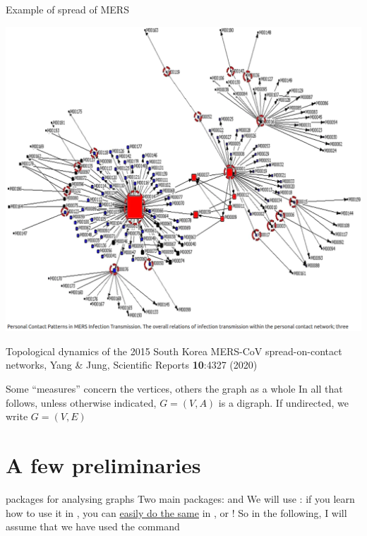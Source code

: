 \documentclass[aspectratio=169]{beamer}\usepackage[]{graphicx}\usepackage[]{xcolor}
\begin{document}
\begin{frame}{Example of spread of MERS}
	\begin{minipage}{0.8\textwidth}
		\hspace*{-\beamerleftmargin}
		\includegraphics[height=\paperheight]{FIGS_slides/YangJung2015SouthKoreaMERS}
	\end{minipage}
	\begin{minipage}{0.18\textwidth}
	\tiny
	Topological dynamics of the 2015 South Korea MERS-CoV spread-on-contact networks, Yang \& Jung, Scientific Reports \textbf{10}:4327 (2020)
	\end{minipage}
\end{frame}


\begin{frame}
	Some ``measures'' concern the vertices, others the graph as a whole
	\vfill
	In all that follows, unless otherwise indicated, $G=(V,A)$ is a digraph. If undirected, we write $G=(V,E)$
\end{frame}


\section{A few  preliminaries}
\begin{frame}{ packages for analysing graphs}
	Two main packages: \href{https://cran.r-project.org/web/packages/network/index.html}{} and \href{https://r.igraph.org/}{}
	\vfill
	We will use : if you learn how to use it in , you can \href{https://igraph.org/index.html}{easily do the same} in ,  or  !
	\vfill
	So in the following, I will assume that we have used the command 
\end{frame}
\end{document}
